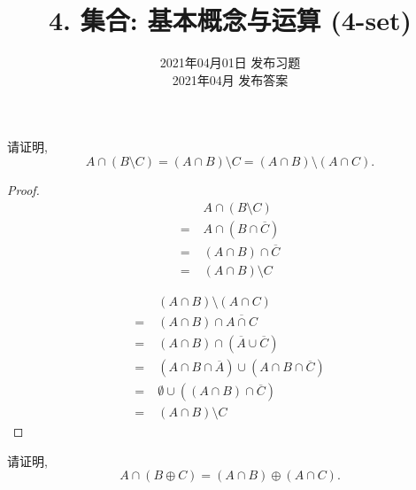 \documentclass[a4paper, justified]{tufte-handout}
\title{4. 集合: 基本概念与运算 (4-set)}
\date{2021年04月01日 发布习题\\ 2021年04月 发布答案}
\begin{document}
\maketitle
\noplagiarism %
\begin{abstract}
\end{abstract}
\beginrequired

\begin{problem}
  请证明,
  \[
    A \cap (B \setminus C) = (A \cap B) \setminus C
                           = (A \cap B) \setminus (A \cap C).
  \]
\end{problem}

\begin{proof}
  \begin{align}
    &A \cap (B \setminus C) \\
    =\; & A \cap (B \cap \overline{C}) \\
    =\; & (A \cap B) \cap \overline{C} \\
    =\; & (A \cap B) \setminus C
  \end{align}

  \begin{align}
    &(A \cap B) \setminus (A \cap C) \\
    =\; & (A \cap B) \cap \overline{A \cap C} \\
    =\; & (A \cap B) \cap (\overline{A} \cup \overline{C}) \\
    =\; & (A \cap B \cap \overline{A}) \cup (A \cap B \cap \overline{C}) \\
    =\; & \emptyset \cup ((A \cap B) \cap \overline{C}) \\
    =\; & (A \cap B) \setminus C
  \end{align}
\end{proof}

\begin{problem}
  请证明,
  \[
    A \cap (B \oplus C) = (A \cap B) \oplus (A \cap C).
  \]
\end{problem}
\end{document}
